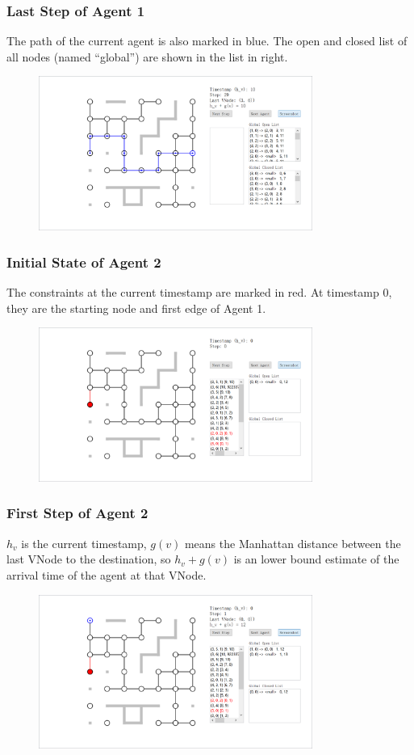 \documentclass{beamer}
\begin{document}
\begin{frame}
\frametitle{Last Step of Agent 1}
The path of the current agent is also marked in blue. The open and closed list of all nodes (named ``global'') are shown in the list in right.
\begin{figure}
\centering
\includegraphics[width=0.8\textwidth]{a1s3.png}
\end{figure}
\end{frame}

\begin{frame}
\frametitle{Initial State of Agent 2}
The constraints at the current timestamp are marked in red. At timestamp 0, they are the starting node and first edge of Agent 1.
\begin{figure}
\centering
\includegraphics[width=0.8\textwidth]{a2s0.png}
\end{figure}
\end{frame}

\begin{frame}
\frametitle{First Step of Agent 2}
$h_v$ is the current timestamp, $g(v)$ means the Manhattan distance between the last VNode to the destination, so $h_v+g(v)$ is an lower bound estimate of the arrival time of the agent at that VNode.
\begin{figure}
\centering
\includegraphics[width=0.8\textwidth]{a2s1.png}
\end{figure}
\end{frame}
\end{document}
